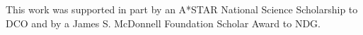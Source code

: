 \documentclass[10pt,letterpaper]{article}
\newcommand{\red}[1]{\textcolor{Red}{#1}}
\begin{document}
This work was supported in part by an A*STAR National Science Scholarship to DCO and by a James S. McDonnell Foundation Scholar Award to NDG.




\setlength{\bibleftmargin}{.125in}
\setlength{\bibindent}{-\bibleftmargin}





	
	
	
\end{document}
